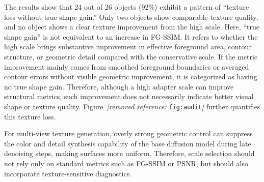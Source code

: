 \documentclass[times,twocolumn,final]{elsarticle}
\providecommand{\DIFdel}[1]{{\protect\color{red} \scriptsize #1}} %
\providecommand{\DIFdelbegin}{} %
\begin{document}
\DIFdelbegin %

\DIFdel{The results show that 24 out of 26 objects (92\%) exhibit a pattern of ``texture loss without true shape gain.'' Only two objects show comparable texture quality, and no object shows a clear texture improvement from the high scale. Here, ``true shape gain'' is not equivalent to an increase in FG-SSIM. It refers to whether the high scale brings substantive improvement in effective foreground area, contour structure, or geometric detail compared with the conservative scale. If the metric improvement mainly comes from smoothed foreground boundaries or averaged contour errors without visible geometric improvement, it is categorized as having no true shape gain. Therefore, although a high adapter scale can improve structural metrics, such improvement does not necessarily indicate better visual shape or texture quality.
Figure~\textit{[removed reference: }\texttt{fig:audit}\textit{]} further quantifies this texture loss.
}%


\DIFdel{For multi-view texture generation, overly strong geometric control can suppress the color and detail synthesis capability of the base diffusion model during late denoising steps, making surfaces more uniform. Therefore, scale selection should not rely only on standard metrics such as FG-SSIM or PSNR, but should also incorporate texture-sensitive diagnostics. }%
\end{document}
